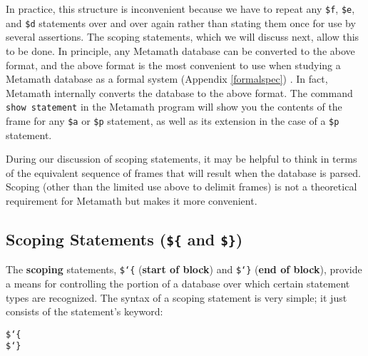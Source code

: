 In practice, this structure is inconvenient because we have to repeat
any \texttt{\$f}, \texttt{\$e}, and \texttt{\$d} statements over and
over again rather than stating them once for use by several assertions.
The scoping statements, which we will discuss next, allow this to be
done.  In principle, any Metamath database can be converted to the above
format, and the above format is the most convenient to use when studying
a Metamath database as a formal system%
   (Appendix \ref{formalspec})%
.
In fact, Metamath internally converts the database to the above format.
The command \texttt{show statement} in the Metamath program will show
you the contents of the frame for any \texttt{\$a} or \texttt{\$p}
statement, as well as its extension in the case of a \texttt{\$p}
statement.


During our discussion of scoping statements, it may be helpful to
think in terms of the equivalent sequence of frames that will result when
the database is parsed.  Scoping (other than the limited
use above to delimit frames) is not a theoretical requirement for
Metamath but makes it more convenient.


\subsection{Scoping Statements (\texttt{\$\{} and \texttt{\$\}})}\label{scoping}


The {\bf scoping} statements, \texttt{\$\char`\{} ({\bf start of block}) and \texttt{\$\char`\}}
({\bf end of block}), provide a means for controlling the portion
of a database over which certain statement types are recognized.  The
syntax of a scoping statement is very simple; it just consists of the
statement's keyword:
\begin{center}
\texttt{\$\char`\{}\\
\texttt{\$\char`\}}
\end{center}

